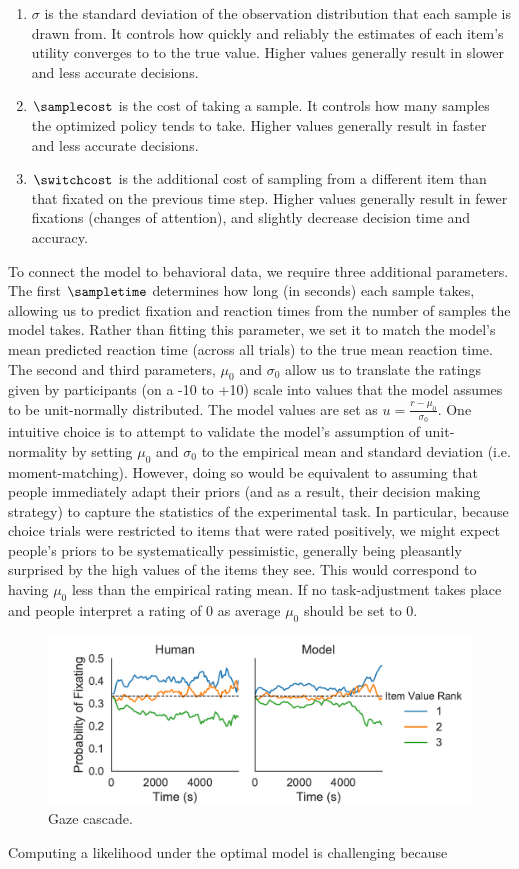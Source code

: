 \documentclass[12pt,a4paperpaper,]{article}
\begin{document}
\begin{enumerate}
  \item $\sigma$ is the standard deviation of the observation distribution that each sample is drawn from. It controls how quickly and reliably the estimates of each item's utility converges to to the true value. Higher values generally result in slower and less accurate decisions.
  \item $\samplecost$ is the cost of taking a sample. It controls how many samples the optimized policy tends to take. Higher values generally result in faster and less accurate decisions.
  \item $\switchcost$ is the additional cost of sampling from a different item than that fixated on the previous time step. Higher values generally result in fewer fixations (changes of attention), and slightly decrease decision time and accuracy.
\end{enumerate}

To connect the model to behavioral data, we require three additional parameters. The first $\sampletime$ determines how long (in seconds) each sample takes, allowing us to predict fixation and reaction times from the number of samples the model takes. Rather than fitting this parameter, we set it to match the model's mean predicted reaction time (across all trials) to the true mean reaction time. The second and third parameters, $\mu_0$ and $\sigma_0$ allow us to translate the ratings given by participants (on a -10 to +10) scale into values that the model assumes to be unit-normally distributed. The model values are set as $u = \frac{r - \mu_0}{\sigma_0}$. One intuitive choice is to attempt to validate the model's assumption of unit-normality by setting $\mu_0$ and $\sigma_0$ to the empirical mean and standard deviation (i.e. moment-matching). However, doing so would be equivalent to assuming that people immediately adapt their priors (and as a result, their decision making strategy) to capture the statistics of the experimental task. In particular, because choice trials were restricted to items that were rated positively, we might expect people's priors to be systematically pessimistic, generally being pleasantly surprised by the high values of the items they see. This would correspond to having $\mu_0$ less than the empirical rating mean. If no task-adjustment takes place and people interpret a rating of 0 as average $\mu_0$ should be set to 0.


\begin{figure}[tb]
  \centering
  \includegraphics[]{figs/prob_fix.pdf}
  \caption{Gaze cascade.}
  \label{fig:figure1}
\end{figure}



Computing a likelihood under the optimal model is challenging because 





\end{document}
